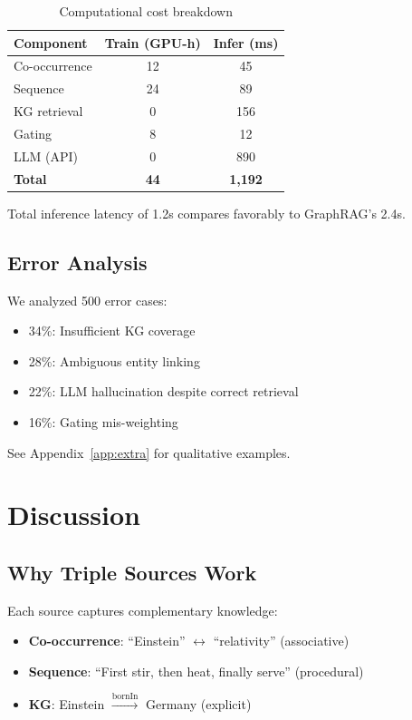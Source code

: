 \documentclass[10pt,twocolumn]{article}
\begin{document}
\begin{table}[t]
\centering
\caption{Computational cost breakdown}
\label{tab:cost}
\small
\begin{tabular}{@{}lcc@{}}
\toprule
\textbf{Component} & \textbf{Train (GPU-h)} & \textbf{Infer (ms)} \\
\midrule
Co-occurrence & 12 & 45 \\
Sequence & 24 & 89 \\
KG retrieval & 0 & 156 \\
Gating & 8 & 12 \\
LLM (API) & 0 & 890 \\
\midrule
\textbf{Total} & \textbf{44} & \textbf{1,192} \\
\bottomrule
\end{tabular}
\end{table}

Total inference latency of 1.2s compares favorably to GraphRAG's 2.4s.

\subsection{Error Analysis}

We analyzed 500 error cases:
\begin{itemize}
    \item 34\%: Insufficient KG coverage
    \item 28\%: Ambiguous entity linking
    \item 22\%: LLM hallucination despite correct retrieval
    \item 16\%: Gating mis-weighting
\end{itemize}

See Appendix~\ref{app:extra} for qualitative examples.

\section{Discussion}

\subsection{Why Triple Sources Work}

Each source captures complementary knowledge:
\begin{itemize}
    \item \textbf{Co-occurrence}: ``Einstein'' $\leftrightarrow$ ``relativity'' (associative)
    \item \textbf{Sequence}: ``First stir, then heat, finally serve'' (procedural)
    \item \textbf{KG}: Einstein $\xrightarrow{\text{bornIn}}$ Germany (explicit)
\end{itemize}
\end{document}
